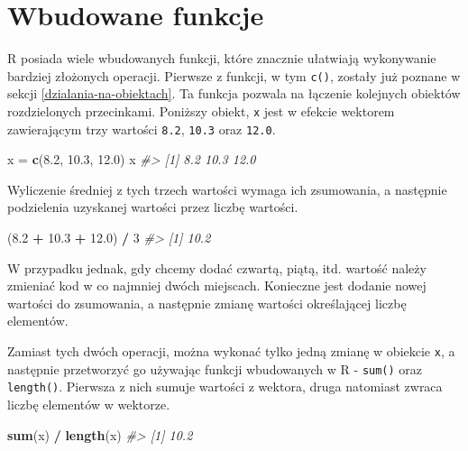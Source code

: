 \documentclass[paper=6in:9in,pagesize=pdftex,headinclude=on,footinclude=on,10pt]{scrbook}
\newenvironment{Shaded}{\begin{snugshade}}{\end{snugshade}}
\newcommand{\CommentTok}[1]{\textcolor[rgb]{0.56,0.35,0.01}{\textit{#1}}}
\newcommand{\DecValTok}[1]{\textcolor[rgb]{0.00,0.00,0.81}{#1}}
\newcommand{\FloatTok}[1]{\textcolor[rgb]{0.00,0.00,0.81}{#1}}
\newcommand{\KeywordTok}[1]{\textcolor[rgb]{0.13,0.29,0.53}{\textbf{#1}}}
\newcommand{\NormalTok}[1]{#1}
\newcommand{\OperatorTok}[1]{\textcolor[rgb]{0.81,0.36,0.00}{\textbf{#1}}}
\newcommand{\StringTok}[1]{\textcolor[rgb]{0.31,0.60,0.02}{#1}}
\begin{document}
\hypertarget{wbudowane-funkcje}{%
\section{Wbudowane funkcje}\label{wbudowane-funkcje}}

R posiada wiele wbudowanych funkcji, które znacznie ułatwiają wykonywanie bardziej złożonych operacji.
Pierwsze z funkcji, w tym \texttt{c()}, zostały już poznane w sekcji \ref{dzialania-na-obiektach}.
Ta funkcja pozwala na łączenie kolejnych obiektów rozdzielonych przecinkami.
Poniższy obiekt, \texttt{x} jest w efekcie wektorem zawierającym trzy wartości \texttt{8.2}, \texttt{10.3} oraz \texttt{12.0}.

\begin{Shaded}
\begin{Highlighting}[]
\NormalTok{x =}\StringTok{ }\KeywordTok{c}\NormalTok{(}\FloatTok{8.2}\NormalTok{, }\FloatTok{10.3}\NormalTok{, }\FloatTok{12.0}\NormalTok{)}
\NormalTok{x}
\CommentTok{#> [1]  8.2 10.3 12.0}
\end{Highlighting}
\end{Shaded}

Wyliczenie średniej z tych trzech wartości wymaga ich zsumowania, a następnie podzielenia uzyskanej wartości przez liczbę wartości.

\begin{Shaded}
\begin{Highlighting}[]
\NormalTok{(}\FloatTok{8.2} \OperatorTok{+}\StringTok{ }\FloatTok{10.3} \OperatorTok{+}\StringTok{ }\FloatTok{12.0}\NormalTok{) }\OperatorTok{/}\StringTok{ }\DecValTok{3}
\CommentTok{#> [1] 10.2}
\end{Highlighting}
\end{Shaded}

W przypadku jednak, gdy chcemy dodać czwartą, piątą, itd. wartość należy zmieniać kod w co najmniej dwóch miejscach.
Konieczne jest dodanie nowej wartości do zsumowania, a następnie zmianę wartości określającej liczbę elementów.

Zamiast tych dwóch operacji, można wykonać tylko jedną zmianę w obiekcie \texttt{x}, a następnie przetworzyć go używając funkcji wbudowanych w R - \texttt{sum()} oraz \texttt{length()}.
Pierwsza z nich sumuje wartości z wektora, druga natomiast zwraca liczbę elementów w wektorze.

\begin{Shaded}
\begin{Highlighting}[]
\KeywordTok{sum}\NormalTok{(x) }\OperatorTok{/}\StringTok{ }\KeywordTok{length}\NormalTok{(x)}
\CommentTok{#> [1] 10.2}
\end{Highlighting}
\end{Shaded}
\end{document}
